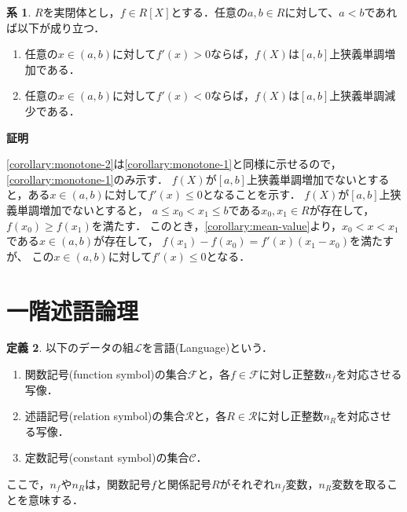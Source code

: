 \documentclass[uplatex, dvipdfmx]{jsarticle}
\makeatletter
\numberwithin{equation}{section}
\renewenvironment{proof}[1][\proofname]{\par
  \pushQED{\qed}%
  \normalfont \topsep6\p@\@plus6\p@\relax
  \trivlist
  \item\relax
  {\bfseries
  #1\@addpunct{.}}\hspace\labelsep\ignorespaces
}{
  \popQED\endtrivlist\@endpefalse
}
\theoremstyle{definition}
\newtheorem{definition}{定義}[section]
\newtheorem{corollary}[definition]{系}
\renewcommand{\proofname}{\textbf{証明}}
\makeatother
\begin{document}
\begin{corollary}\label{corollary:monotone}
     $R$を実閉体とし，$f \in R[X]$とする．任意の$a, b \in R$に対して、$a<b$であれば以下が成り立つ．
     \begin{enumerate}
          \item \label{corollary:monotone-1}
          任意の$x \in (a,b)$に対して$f'(x)>0$ならば，$f(X)$は$[a,b]$上狭義単調増加である．
          \item \label{corollary:monotone-2}
          任意の$x \in (a,b)$に対して$f'(x)<0$ならば，$f(X)$は$[a,b]$上狭義単調減少である．
     \end{enumerate}
\end{corollary}
\begin{proof}
     \ref{corollary:monotone-2}は\ref{corollary:monotone-1}と同様に示せるので，\ref{corollary:monotone-1}のみ示す．
     $f(X)$が$[a,b]$上狭義単調増加でないとすると，ある$x \in (a,b)$に対して$f'(x) \leq 0$となることを示す．
     $f(X)$が$[a,b]$上狭義単調増加でないとすると，
     $a \leq x_0 < x_1 \leq b$である$x_0, x_1 \in R$が存在して，$f(x_0) \geq f(x_1)$を満たす．
     このとき，\cref{corollary:mean-value}より，$x_0 < x < x_1$である$x \in (a,b)$が存在して，
     $f(x_1) - f(x_0) = f'(x)(x_1 - x_0)$を満たすが、
     この$x \in (a,b)$に対して$f'(x) \leq 0$となる．
\end{proof}

\section{一階述語論理}


\begin{definition}
     以下のデータの組$\mathcal{L}$を言語(Language)という．
     \begin{enumerate}
          \item 関数記号(function symbol)の集合$\mathcal{F}$と，各$f \in \mathcal{F}$に対し正整数$n_f$を対応させる写像．
          \item 述語記号(relation symbol)の集合$\mathcal{R}$と，各$R \in \mathcal{R}$に対し正整数$n_R$を対応させる写像．
          \item 定数記号(constant symbol)の集合$\mathcal{C}$．
     \end{enumerate}
\end{definition}

ここで，$n_f$や$n_R$は，関数記号$f$と関係記号$R$がそれぞれ$n_f$変数，$n_R$変数を取ることを意味する．
\end{document}
